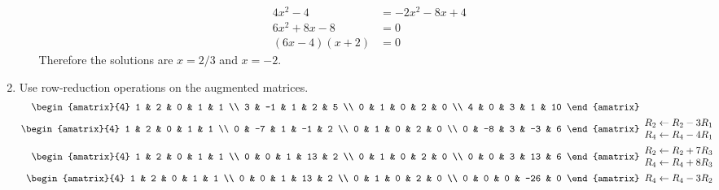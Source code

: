 \documentclass{article}
\begin{document}
\begin{enumerate}
\begin{enumerate}
\begin{align*}
 4x^2 - 4 &= -2x^2 - 8x + 4 \\
 6x^2 + 8x - 8 &= 0 \\
 (6x - 4)(x + 2) &= 0
\end{align*}
Therefore the solutions are $x = 2/3$ and $x = -2$.
\end{enumerate}
\item 
Use row-reduction operations on the augmented matrices.
\begin{align}
 \begin{amatrix}{4}
  1 & 2 & 0 & 1 & 1 \\
  3 & -1 & 1 & 2 & 5 \\
  0 & 1 & 0 & 2 & 0 \\
  4 & 0 & 3 & 1 & 10
 \end{amatrix}&
 \nonumber \\
 \begin{amatrix}{4}
  1 & 2 & 0 & 1 & 1 \\
  0 & -7 & 1 & -1 & 2 \\
  0 & 1 & 0 & 2 & 0 \\
  0 & -8 & 3 & -3 & 6
 \end{amatrix}&
 \begin{array}{l}
  R_2 \leftarrow R_2 - 3R_1 \\ R_4 \leftarrow R_4 - 4R_1 
 \end{array}
 \nonumber \\
 \begin{amatrix}{4}
  1 & 2 & 0 & 1 & 1 \\
  0 & 0 & 1 & 13 & 2 \\
  0 & 1 & 0 & 2 & 0 \\
  0 & 0 & 3 & 13 & 6
 \end{amatrix}&
 \begin{array}{l}
  R_2 \leftarrow R_2 + 7R_3 \\ R_4 \leftarrow R_4 + 8R_3
 \end{array}
 \nonumber \\
 \begin{amatrix}{4}
  1 & 2 & 0 & 1 & 1 \\
  0 & 0 & 1 & 13 & 2 \\
  0 & 1 & 0 & 2 & 0 \\
  0 & 0 & 0 & -26 & 0
 \end{amatrix}&
 \begin{array}{l}
  R_4 \leftarrow R_4 - 3R_2
 \end{array}
 \nonumber
\end{align}


\end{enumerate}
\end{document}
